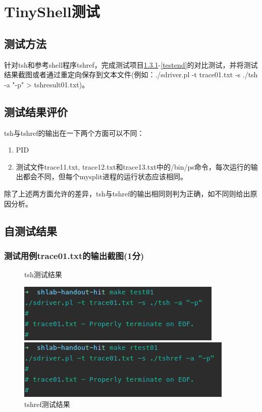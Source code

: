 \section{TinyShell测试}

\subsection{测试方法}
针对tsh和参考shell程序tshref，完成测试项目\ref{testbegin}-\ref{testend}的对比测试，并将测试结果截图或者通过重定向保存到文本文件(例如：./sdriver.pl -t trace01.txt -s ./tsh -a "-p" > tshresult01.txt)。

\subsection{测试结果评价}
tsh与tshref的输出在一下两个方面可以不同：

\begin{enumerate}
\item PID
\item 测试文件trace11.txt, trace12.txt和trace13.txt中的/bin/ps命令，每次运行的输出都会不同，但每个mysplit进程的运行状态应该相同。
\end{enumerate}

除了上述两方面允许的差异，tsh与tshref的输出相同则判为正确，如不同则给出原因分析。

\subsection{自测试结果}\label{testcmp}

\subsubsection{测试用例trace01.txt的输出截图(1分)}\label{testbegin}

\begin{figure}[H]
\begin{minipage}[c]{0.5\linewidth}
    \centering
    \caption{tsh测试结果}
    \includegraphics[width=0.7\linewidth]{figures/test01.png}
\end{minipage}
\begin{minipage}[c]{0.5\linewidth}
    \centering
    \caption{tshref测试结果}
    \includegraphics[width=0.7\linewidth]{figures/rtest01.png}
\end{minipage}
\end{figure}

